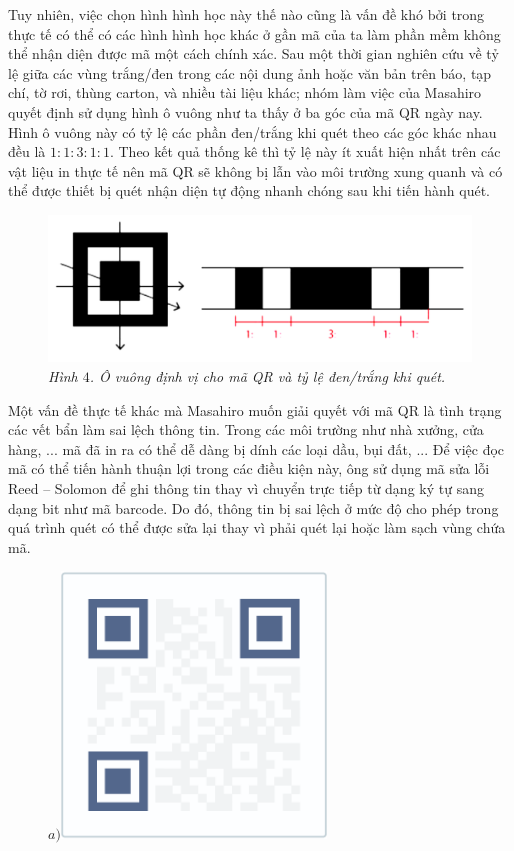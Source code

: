 \begin{multicols}{2}
	\vskip 0.05cm
	Tuy nhiên, việc chọn hình hình học này thế nào cũng là vấn đề khó bởi trong thực tế có thể có các hình hình học khác ở gần mã của ta làm phần mềm không thể nhận diện được mã một cách chính xác. Sau một thời gian nghiên cứu về tỷ lệ giữa các vùng trắng/đen trong các nội dung  ảnh hoặc văn bản trên báo, tạp chí, tờ rơi, thùng carton, và nhiều tài liệu khác; nhóm làm việc của Masahiro quyết định sử dụng hình ô vuông như ta thấy ở ba góc của mã QR ngày nay. Hình ô vuông này có tỷ lệ các phần đen/trắng khi quét theo các góc khác nhau đều là $1 : 1 : 3 : 1 : 1$. Theo kết quả thống kê thì tỷ lệ này ít xuất hiện nhất trên các vật liệu in thực tế nên mã QR sẽ không bị lẫn vào môi trường xung quanh và có thể được thiết bị quét nhận diện tự động nhanh chóng sau khi tiến hành quét.
	\begin{figure}[H]
		\vspace*{-10pt}
		\centering
		\captionsetup{labelformat= empty, justification=centering}
		\includegraphics[width=1\linewidth]{6}
		\caption{\small\textit{\color{toanhocdoisong}Hình $4$. Ô vuông định vị cho mã QR và tỷ lệ đen/trắng khi quét.}}
		\vspace*{-10pt}
	\end{figure}
	Một vấn đề thực tế khác mà Masahiro muốn giải quyết với mã QR là tình trạng các vết bẩn làm sai lệch thông tin. Trong các môi trường như nhà xưởng, cửa hàng, ... mã đã in ra có thể dễ dàng bị dính các loại dầu, bụi đất, ... Để việc đọc mã có thể tiến hành thuận lợi trong các điều kiện này, ông sử dụng mã sửa lỗi Reed -- Solomon để ghi thông tin thay vì chuyển trực tiếp từ dạng ký tự sang dạng bit như mã barcode. Do đó, thông tin bị sai lệch ở mức độ cho phép trong quá trình quét có thể được sửa lại thay vì phải quét lại hoặc làm sạch vùng chứa mã.
	\begin{figure}[H]
		\vspace*{-5pt}
		\centering
		\captionsetup{labelformat= empty, justification=centering}
		$a)$\includegraphics[height=0.35\linewidth]{7}

\end{figure}
\end{multicols}
